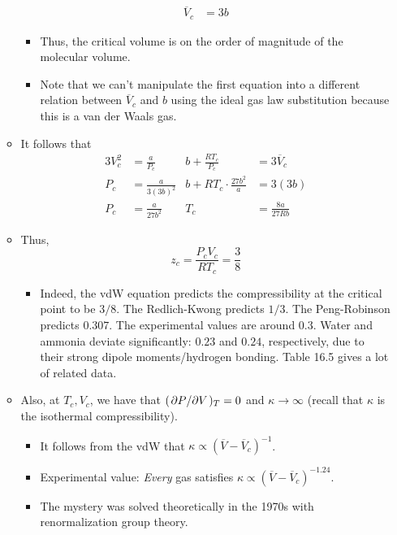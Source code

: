\documentclass[../notes.tex]{subfiles}
\begin{document}
\begin{itemize}
\begin{itemize}
\begin{align*}
            \overline{V}_c &= 3b
        \end{align*}
        \begin{itemize}
            \item Thus, the critical volume is on the order of magnitude of the molecular volume.
            \item Note that we can't manipulate the first equation into a different relation between $\overline{V}_c$ and $b$ using the ideal gas law substitution because this is a van der Waals gas.
        \end{itemize}
        \item It follows that
        \begin{align*}
            3V_c^2 &= \frac{a}{P_c}&
                b+\frac{RT_c}{P_c} &= 3\overline{V}_c\\
            P_c &= \frac{a}{3(3b)^2}&
                b+RT_c\cdot\frac{27b^2}{a} &= 3(3b)\\
            P_c &= \frac{a}{27b^2}&
                T_c &= \frac{8a}{27Rb}
        \end{align*}
        \item Thus,
        \begin{equation*}
            z_c = \frac{P_cV_c}{RT_c} = \frac{3}{8}
        \end{equation*}
        \begin{itemize}
            \item Indeed, the vdW equation predicts the compressibility at the critical point to be $3/8$. The Redlich-Kwong predicts $1/3$. The Peng-Robinson predicts $0.307$. The experimental values are around $0.3$. Water and ammonia deviate significantly: $0.23$ and $0.24$, respectively, due to their strong dipole moments/hydrogen bonding. Table 16.5 gives a lot of related data.
        \end{itemize}
        \item Also, at $T_c,V_c$, we have that $(\pdv*{P}{V})_T=0$ and $\kappa\to\infty$ (recall that $\kappa$ is the isothermal compressibility).
        \begin{itemize}
            \item It follows from the vdW that $\kappa\propto(\overline{V}-\overline{V}_c)^{-1}$.
            \item Experimental value: \emph{Every} gas satisfies $\kappa\propto(\overline{V}-\overline{V}_c)^{-1.24}$.
            \item The mystery was solved theoretically in the 1970s with renormalization group theory.

\end{itemize}
\end{itemize}
\end{itemize}
\end{document}
